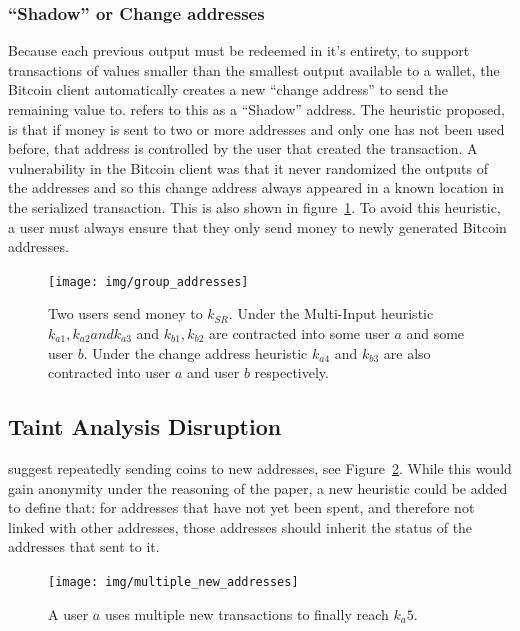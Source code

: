 \subsubsection{``Shadow'' or Change addresses}
Because each previous output must be redeemed in it's entirety, to support transactions of values smaller than the smallest output available to a wallet, the Bitcoin client automatically creates a new ``change address'' to send the remaining value to.  \cite{eval-priv} refers to this as a ``Shadow'' address.  The heuristic proposed, is that if money is sent to two or more addresses and only one has not been used before, that address is controlled by the user that created the transaction. A vulnerability in the Bitcoin client was that it never randomized the outputs of the addresses and so this change address always appeared in a known location in the serialized transaction\cite{cve-ordered-trans}. This is also shown in figure~\ref{fig:multi-spend}. To avoid this heuristic, a user must always ensure that they only send money to newly generated Bitcoin addresses.

\begin{figure}[t!]
    \centering
    \texttt{[image: img/group\_addresses]}
     \caption{Two users send money to $k_{SR}$. Under the Multi-Input  heuristic $k_{a1}, k_{a2} and k_{a3}$ and $k_{b1}, k_{b2}$ are contracted into  some user $a$ and some user $b$. Under the change address heuristic  $k_{a4}$ and $k_{b3}$ are also contracted into user $a$ and user $b$  respectively. }
    \label{fig:multi-spend}
\end{figure}

\subsection{Taint Analysis Disruption}
\textcite{reid-anon} suggest repeatedly sending coins to new addresses, see Figure~\ref{fig:multi-new-addresses}. While this would gain anonymity under the reasoning of the paper, a new heuristic could be added to define that: for addresses that have not yet been spent, and therefore not linked with other addresses, those addresses should inherit the status of the addresses that sent to it.

\begin{figure}[t!]
    \centering
    \texttt{[image: img/multiple\_new\_addresses]}
      \caption{A user $a$ uses multiple new transactions to finally reach $k_a5$. }
    \label{fig:multi-new-addresses}
\end{figure}

